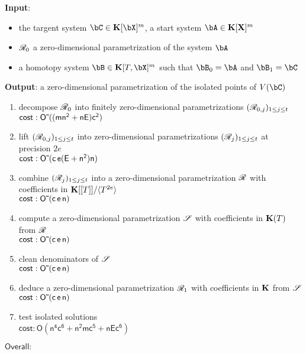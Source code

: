 \documentclass[12pt]{article}
\begin{document}
\begin{algorithm}
\caption{$\mathsf{Homotopy}$}
{\bf Input}:\begin{itemize}
\item the targent system $\bC \in \KK[\bX]^{m}$, a start system $\bA \in \KK[\X]^m$
\item $\mathscr{R}_0$ a zero-dimensional parametrization of the system $\bA$
\item a homotopy system $\bB \in \KK[T,\bX]^m$ such that $\bB_{0} = \bA$ and $\bB_1 = \bC$
\end{itemize}
{\bf Output}: a zero-dimensional parametrization of the isolated points of $V(\bC)$
\begin{enumerate}
\item decompose $\mathscr{R}_0$ into finitely zero-dimensional parametrizations $(\mathscr{R}_{0,j})_{1 \leq j \leq t}$\\
$\mathsf{cost: {O}{\,\tilde{ }\,}((mn^2 + nE) c^2)}$
\item lift $(\mathscr{R}_{0,j})_{1 \leq j \leq t}$ into zero-dimensional parametrizations $(\mathscr{R}_j)_{1\leq j \leq t}$ at precision $2e$\\
$\mathsf{cost: {O}{\,\tilde{ }\,}(c\,e (E+n^2)n)}$
\item combine $(\mathscr{R}_j)_{1 \leq j \leq t}$ into a zero-dimensional parametrization $\mathscr{R}$ with coefficients in $\mathbf{K}[[T]]/\langle T^{2e}\rangle$\\
$\mathsf{cost: {O}{\,\tilde{ }\,}(c\,e\,n)}$
\item compute a zero-dimensional parametrization $\mathscr{S}$ with coefficients in $\mathbf{K}(T)$ from $\mathscr{R}$\\
$\mathsf{cost: {O}{\,\tilde{ }\,}(c\,e\,n)}$
\item clean denominators of $\mathscr{S}$\\
$\mathsf{cost: {O}{\,\tilde{ }\,}(c\,e\,n)}$
\item deduce a zero-dimensional parametrization $\mathscr{R}_1$ with coefficients in $\mathbf{K}$ from $\mathscr{S}$\\
$\mathsf{cost: {O}{\,\tilde{ }\,}(c\,e\,n)}$
\item test isolated solutions \\
$\mathsf{cost: O(n^4 c^6 + n^2 m c^5 + n E c^6)}$
\end{enumerate}
$\mathsf{Overall: }$
\label{DetSys}
\end{algorithm}
 

\end{document}
